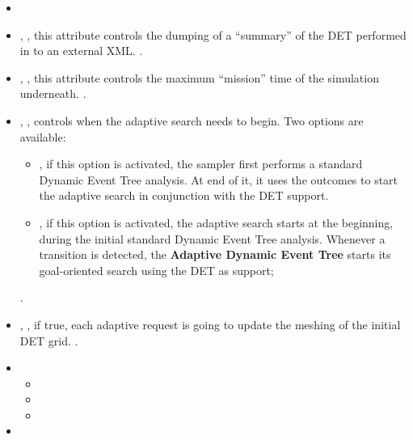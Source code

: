 %
\attrIntro

\begin{itemize}
  \itemsep0em
  \item \nameDescription
  \item {}, ,
    this attribute controls the dumping of a ``summary'' of the DET performed in
    to an external XML.
    .
  \item {}, , this
    attribute controls the maximum ``mission'' time of the simulation
    underneath.
    .
  \item {}, , controls when the
    adaptive search needs to begin.
    Two options are available:
    \begin{itemize}
       \item {}, if this option is activated, the sampler first
         performs a standard Dynamic Event Tree analysis. At end of it, it uses
         the outcomes to start the adaptive search in conjunction with the DET
         support.
       \item {}, if this option is activated, the adaptive
         search starts at the beginning, during the initial standard Dynamic
         Event Tree analysis.
         Whenever a transition is detected, the
         \textbf{Adaptive Dynamic Event Tree} starts its goal-oriented search
         using the DET as support;
    \end{itemize}
      .
  \item {}, , if true,
    each adaptive request is going to update the meshing of the initial DET
    grid.
    .
\end{itemize}

\begin{itemize}
\item \variableDescription
  \variableChildrenIntro
 \begin{itemize}
    \item \distributionDescription
    \item \functionDescription
    \item \gridDescription
  \end{itemize}
  \item \constantVariablesDescription
\end{itemize}

